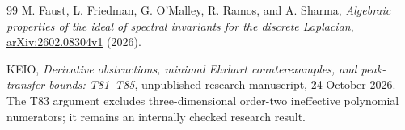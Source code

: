 \documentclass[11pt,a4paper]{article}
\theoremstyle{definition}\newtheorem{definition}[theorem]{Definition}
\theoremstyle{remark}\newtheorem{remark}[theorem]{Remark}
\begin{document}
\begin{thebibliography}{99}
M. Faust, L. Friedman, G. O'Malley, R. Ramos, and A. Sharma,
\emph{Algebraic properties of the ideal of spectral invariants for the
discrete Laplacian},
\href{https://arxiv.org/abs/2602.08304v1}{arXiv:2602.08304v1} (2026).

KEIO, \emph{Derivative obstructions, minimal Ehrhart counterexamples,
and peak-transfer bounds: T81--T85}, unpublished research manuscript,
24 October 2026. The T83 argument excludes three-dimensional
order-two ineffective polynomial numerators; it remains an internally
checked research result.

\end{thebibliography}
\end{document}

